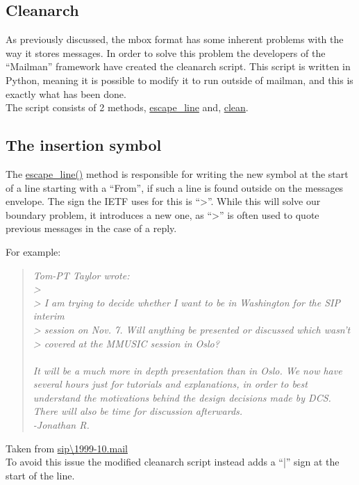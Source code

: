 \documentclass[a4paper,english]{report}
\begin{document}
\subsection{Cleanarch}

As previously discussed, the mbox format has some inherent problems with the way it stores messages. In order to solve this problem the developers of the “Mailman” framework have created the cleanarch script. This script is written in Python, meaning it is possible to modify it to run outside of mailman, and this is exactly what has been done.\\


The script consists of 2 methods, \url{escape_line} and, \url{clean}.\

\subsection{The insertion symbol }

The \url{escape_line()} method is responsible for writing the new symbol at the start of a line starting with a “From”, if such a line is found outside on the messages envelope. The sign the IETF uses for this is “>”. While this will solve our boundary problem, it introduces a new one, as “>” is often used to quote previous messages in the case of a reply.

For example:
\begin{quotation}


\textit{
\noindent
Tom-PT Taylor wrote:\\
> \\
> I am trying to decide whether I want to be in Washington for the SIP interim\\
> session on Nov. 7.  Will anything be presented or discussed which wasn't\\
> covered at the MMUSIC session in Oslo?\\\\
\noindent
It will be a much more in depth presentation than in Oslo. We now have
several hours just for tutorials and explanations, in order to best
understand the motivations behind the design decisions made by DCS.
There will also be time for discussion afterwards.\\
\noindent
-Jonathan R.}
\end{quotation}

Taken from  \url{sip\1999-10.mail}\\

To avoid this issue the modified cleanarch script instead adds a “|” sign at the start of the line.\\
\end{document}
